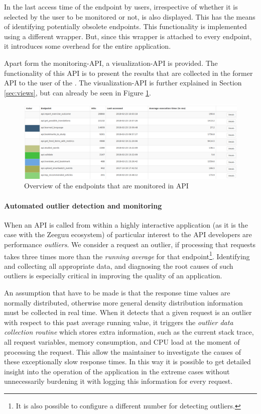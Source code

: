 \documentclass[conference]{IEEEtran}
\begin{document}
  In  the last access time of the endpoint by users, irrespective of whether it is selected by the user to be monitored or not, is also displayed. This has the means of identifying potentially obsolete endpoints. This functionality is implemented using a different wrapper. But, since this wrapper is attached to every endpoint, it introduces some overhead for the entire application.

Apart form the monitoring-API, a visualization-API is provided. The functionality of this API is to present the results that are collected in the former API to the user of the \tool. The visualization-API is further explained in Section \ref{sec:views}, but can already be seen in Figure \ref{fig:overview}.

    \begin{figure}
      \centering
      \includegraphics[width=\linewidth]{overview.png}
      \caption{Overview of the endpoints that are monitored in \zee API}
      \label{fig:overview}
    \end{figure}
  
\paragraph{Automated outlier detection and monitoring}
  When an API is called from within a highly interactive application (as it is the case with the Zeeguu ecosystem) of particular interest to the API developers are performance {\em outliers}. We consider a request an outlier, if processing that requests takes three times more than the {\em running average} for that endpoint\footnote{It is also possible to configure a different number for detecting outliers.}. Identifying and collecting all appropriate data, and diagnosing the root causes of such outliers is especially critical in improving the quality of an application. 
  
  An assumption that have to be made is that the response time values are normally distributed, otherwise more general density distribution information must be collected in real time. When it detects that a given request is an outlier with respect to this past average running value, it triggers the {\em outlier data collection routine} which stores extra information, such as the current stack trace, all request variables, memory consumption, and CPU load at the moment of processing the request. This allow the maintainer to investigate the causes of these exceptionally slow response times. In this way it is possible to get detailed insight into the operation of the application in the extreme cases without unnecessarily burdening it with logging this information for every request.
  
\end{document}
